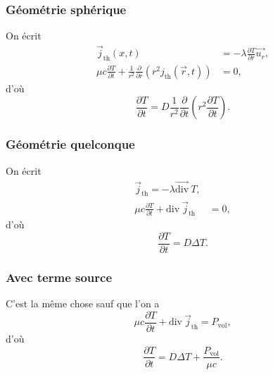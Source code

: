         \subsubsection{Géométrie sphérique}
            
            On écrit 
            \begin{equation*}
                \begin{aligned}
                    \vec{j}_{\text{th}}(x,t)&=-\lambda\frac{\partial T}{\partial r}\vec{u_r},\\
                    \mu c\frac{\partial T}{\partial t}+\frac{1}{r^{2}}\frac{\partial}{\partial r}\left(r^{2}j_{\text{th}}(\vec{r},t)\right)&=0,
                \end{aligned}
            \end{equation*}
            d'où
            \begin{equation*}
                \boxed{
                    \frac{\partial T}{\partial t}=D\frac{1}{r^{2}}\frac{\partial}{\partial t}\left(r^{2}\frac{\partial T}{\partial t}\right).
                }
            \end{equation*}
        
        \subsubsection{Géométrie quelconque}
            
            On écrit
            \begin{equation*}
                \begin{aligned}
                    \vec{j}_{\text{th}}=-\lambda\vec{\mathrm{div}}~T,\\
                    \mu c\frac{\partial T}{\partial t}+\mathrm{div}~\vec{j}_{\text{th}}&=0,
                \end{aligned}
            \end{equation*}
            d'où
            \begin{equation*}
                \boxed{
                    \frac{\partial T}{\partial t}=D\Delta T.
                }
            \end{equation*}

        \subsubsection{Avec terme source}

            C'est la même chose sauf que l'on a 
            \begin{equation*}
                \mu c\frac{\partial T}{\partial t}+\mathrm{div}~\vec{j}_{\text{th}}=P_{\text{vol}},
            \end{equation*}
            d'où
            \begin{equation*}
                \boxed{
                    \frac{\partial T}{\partial t}=D\Delta T+\frac{P_{\text{vol}}}{\mu c}.
                }
            \end{equation*}

